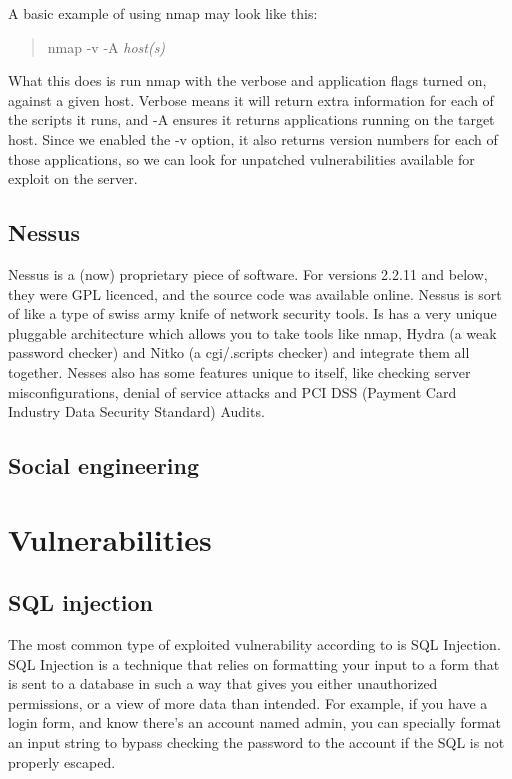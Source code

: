 \documentclass[12pt]{article}
\begin{document}
A basic example of using nmap may look like this:

\begin{quote}
    nmap -v -A \textit{host(s)}
\end{quote}

What this does is run nmap with the verbose and application flags turned on,
against a given host. Verbose means it will return extra information for each 
of the scripts it runs, and -A ensures it returns applications running on the
target host. Since we enabled the -v option, it also returns version numbers
for each of those applications, so we can look for unpatched vulnerabilities
available for exploit on the server.

\subsection{Nessus}

Nessus is a (now) proprietary piece of software. For versions 2.2.11 and below,
they were GPL licenced, and the source code was available online. Nessus is
sort of like a type of swiss army knife of network security tools. Is has
a very unique pluggable architecture which allows you to take tools like
nmap, Hydra (a weak password checker) and Nitko (a cgi/.scripts checker) and
integrate them all together. Nesses also has some features unique to itself,
like checking server misconfigurations, denial of service attacks and
PCI DSS (Payment Card Industry Data Security Standard) Audits.

\subsection{Social engineering}

\section{Vulnerabilities}

\subsection{SQL injection}

The most common type of exploited vulnerability according to
\cite{mostcommonvulnerability} is SQL Injection. SQL Injection is a technique
that relies on formatting your input to a form that is sent to a database in
such a way that gives you either unauthorized permissions, or a view of more
data than intended. For example, if you have a login form, and know there's
an account named admin, you can specially format an input string to bypass
checking the password to the account if the SQL is not properly escaped.
\end{document}

